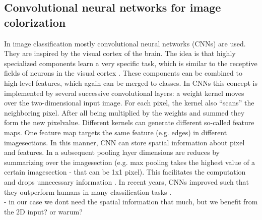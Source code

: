 \documentclass[12pt,letterpaper]{article}
\begin{document}
\subsection{Convolutional neural networks for image colorization}
In image classification mostly convolutional neural networks (CNNs) are used. They are inspired by the visual cortex of the brain. The idea is that highly specialized components learn a very specific task, which is similar to the receptive fields of neurons in the visual cortex \citep{Hubel1962}. These components can be combined to high-level features, which again can be merged to classes. In CNNs this concept is implemented by several successive convolutional layers: a weight kernel moves over the two-dimensional input image. For each pixel, the kernel also \enquote{scans} the neighboring pixel. After all being multiplied by the weights and summed they form the new pixelvalue. Different kernels can generate different so-called feature maps. One feature map targets the same feature (e.g. edges) in different imagesections. In this manner, CNN can store spatial information about pixel and features. In a subsequent pooling layer dimensions are reduces by summarizing over the imagesection (e.g. max pooling takes the highest value of a certain imagesection - that can be 1x1 pixel). This facilitates the computation and drops unnecessary information \citep{Lecture.2019}. In recent years, CNNs improved such that they outperform humans in many classification tasks \citep{Russakovsky.2014}.\\
- in our case we dont need the spatial information that much, but we benefit from the 2D input? or warum?

\end{document}
